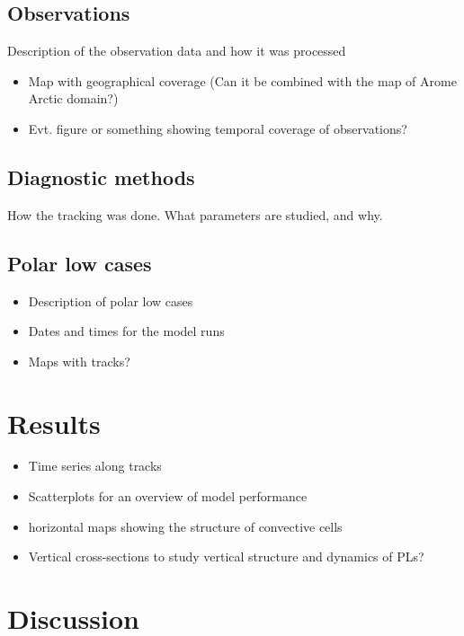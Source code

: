 \documentclass[a4paper,10pt]{article}
\begin{document}
  \subsection{Observations}
    Description of the observation data and how it was processed
    \begin{itemize}
      \item Map with geographical coverage (Can it be combined with the map of Arome Arctic domain?)
      \item Evt. figure or something showing temporal coverage of observations?
    \end{itemize}
    
  \subsection{Diagnostic methods}
    How the tracking was done. What parameters are studied, and why.
  \subsection{Polar low cases}
    \begin{itemize}
      \item Description of polar low cases
      \item Dates and times for the model runs
      \item Maps with tracks?
    \end{itemize}

\section{Results}
  \begin{itemize} 

    \item Time series along tracks

    \item Scatterplots for an overview of model performance

    \item horizontal maps showing the structure of convective cells

    \item Vertical cross-sections to study vertical structure and dynamics of PLs?

  \end{itemize}
\section{Discussion}
\end{document}
